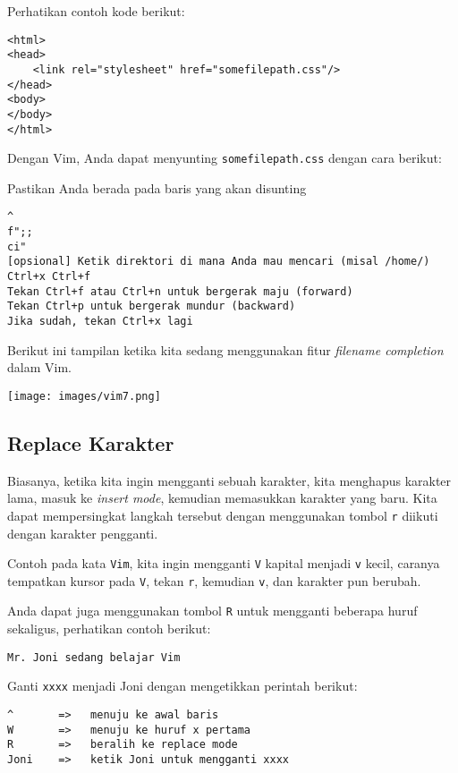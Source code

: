 \documentclass{article}
\begin{document}
Perhatikan contoh kode berikut:

\begin{verbatim}
<html>
<head>
    <link rel="stylesheet" href="somefilepath.css"/>
</head>
<body>
</body>
</html>
\end{verbatim}

Dengan Vim, Anda dapat menyunting \verb=somefilepath.css=
dengan cara berikut:

Pastikan Anda berada pada baris yang akan disunting

\begin{verbatim}
^
f";;
ci"
[opsional] Ketik direktori di mana Anda mau mencari (misal /home/)
Ctrl+x Ctrl+f
Tekan Ctrl+f atau Ctrl+n untuk bergerak maju (forward)
Tekan Ctrl+p untuk bergerak mundur (backward)
Jika sudah, tekan Ctrl+x lagi
\end{verbatim}

Berikut ini tampilan ketika kita sedang menggunakan fitur
\emph{filename completion} dalam Vim.

\vspace{12pt}

\texttt{[image: images/vim7.png]}

\vspace{12pt}

\subsection{Replace Karakter}
Biasanya, ketika kita ingin mengganti sebuah karakter, kita
menghapus karakter lama, masuk ke \emph{insert mode},
kemudian memasukkan karakter yang baru. Kita dapat
mempersingkat langkah tersebut dengan menggunakan tombol
\verb=r= diikuti dengan karakter pengganti.

Contoh pada kata \verb=Vim=, kita ingin mengganti \verb=V=
kapital menjadi \verb=v= kecil, caranya tempatkan kursor
pada \verb=V=, tekan \verb=r=, kemudian \verb=v=, dan
karakter pun berubah.

Anda dapat juga menggunakan tombol \verb=R= untuk mengganti
beberapa huruf sekaligus, perhatikan contoh berikut:

\begin{verbatim}
Mr. Joni sedang belajar Vim
\end{verbatim}

Ganti \verb=xxxx= menjadi Joni dengan mengetikkan perintah
berikut:

\begin{verbatim}
^       =>   menuju ke awal baris
W       =>   menuju ke huruf x pertama
R       =>   beralih ke replace mode
Joni    =>   ketik Joni untuk mengganti xxxx
\end{verbatim}
\end{document}
